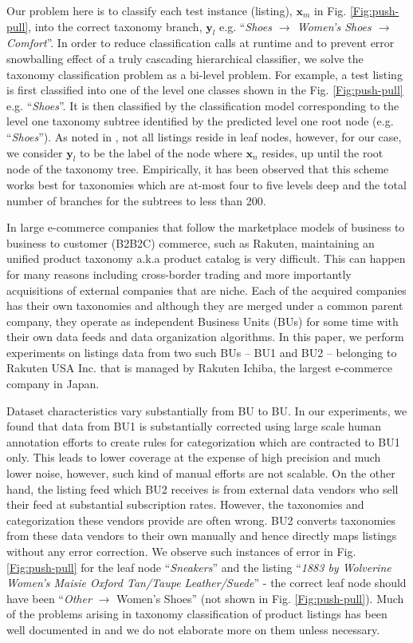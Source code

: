 Our problem here is to classify each test instance (listing), $\bm{x}_m$ in Fig. \ref{Fig:push-pull}, into the correct taxonomy branch, $\bm{y}_l$ e.g. ``\textit{Shoes $\rightarrow$ Women's Shoes $\rightarrow$ Comfort}''.
In order to reduce classification calls at runtime and to prevent error snowballing effect of a truly cascading hierarchical classifier, we solve the taxonomy classification problem as a bi-level problem.
For example, a test listing is first classified into one of the level one classes shown in the Fig. \ref{Fig:push-pull} e.g. ``\textit{Shoes}''.
It is then classified by the classification model corresponding to the level one taxonomy subtree identified by the predicted level one root node (e.g. ``\textit{Shoes}'').
As noted in \cite{Julian15}, not all listings reside in leaf nodes, however, for our case, we consider $\bm{y}_l$ to be the label of the node where $\bm{x}_n$ resides, up until the root node of the taxonomy tree.
Empirically, it has been observed that this scheme works best for taxonomies which are at-most four to five levels deep and the total number of branches for the subtrees to less than 200. 

In large e-commerce companies that follow the marketplace models of business to business to customer (B2B2C) commerce, such as Rakuten, maintaining an unified product taxonomy a.k.a product catalog is very difficult. 
This can happen for many reasons including cross-border trading and more importantly acquisitions of external companies that are niche.
Each of the acquired companies has their own taxonomies and although they are merged under a common parent company, they operate as independent Business Units (BUs)  for some time with their own data feeds and data organization algorithms.
In this paper, we perform experiments on listings data from two such BUs -- BU1 and BU2 -- belonging to Rakuten USA Inc.
that is managed by Rakuten Ichiba, the largest e-commerce company in Japan.

Dataset characteristics vary substantially from BU to BU.
In our experiments, we found that data from BU1 is substantially corrected using large scale human annotation efforts to create rules for categorization which are contracted to BU1 only.
This leads to lower coverage at the expense of high precision and much lower noise, however, such kind of manual efforts are not scalable.
On the other hand, the listing feed which BU2 receives is from external data vendors who sell their feed at substantial subscription rates. 
However, the taxonomies and categorization these vendors provide are often wrong.
BU2 converts taxonomies from these data vendors to their own manually and hence directly maps listings without any error correction.
We observe such instances of error in Fig. \ref{Fig:push-pull} for the leaf node ``\textit{Sneakers}'' and the listing ``\textit{1883 by Wolverine Women's Maisie Oxford Tan/Taupe Leather/Suede}'' - the correct leaf node should have been ``\textit{Other} $\rightarrow$ Women's Shoes'' (not shown in Fig. \ref{Fig:push-pull}).
Much of the problems arising in taxonomy classification of product listings has been well documented in \cite{Sun14} and we do not elaborate more on them unless necessary.

